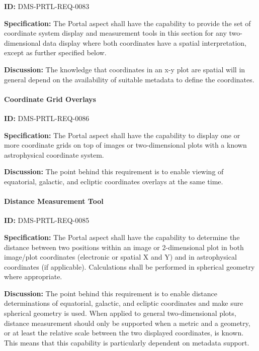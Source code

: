 \documentclass[SE,toc,lsstdraft]{lsstdoc}
\begin{document}
\label{DMS-PRTL-REQ-0083}
\textbf{ID:} DMS-PRTL-REQ-0083

\textbf{Specification:}
The Portal aspect shall have the capability to provide the set of coordinate system display and measurement tools in this section for any two-dimensional data display where both coordinates have a spatial interpretation, except as further specified below.

\textbf{Discussion:}
The knowledge that coordinates in an x-y plot are spatial will in general depend on the availability of suitable metadata to define the coordinates.

\paragraph{Coordinate Grid Overlays}\hfill  %

\label{DMS-PRTL-REQ-0086}
\textbf{ID:} DMS-PRTL-REQ-0086

\textbf{Specification:}
The Portal aspect shall have the capability to display one or more coordinate grids on top of images or two-dimensional plots with a known astrophysical coordinate system.

\textbf{Discussion:}
The point behind this requirement is to enable viewing of equatorial, galactic, and ecliptic coordinates overlays at the same time.

\paragraph{Distance Measurement Tool}\hfill  %

\label{DMS-PRTL-REQ-0085}
\textbf{ID:} DMS-PRTL-REQ-0085

\textbf{Specification:}
The Portal aspect shall have the capability to determine the distance between two positions within an image or 2-dimensional plot in both image/plot coordinates (electronic or spatial X and Y) and in astrophysical coordinates (if applicable).  Calculations shall be performed in spherical geometry where appropriate.

\textbf{Discussion:}
The point behind this requirement is to enable distance determinations of equatorial, galactic, and ecliptic coordinates and make sure spherical geometry is used.
When applied to general two-dimensional plots, distance measurement should only be supported when a metric and a geometry, or at least the relative scale between the two displayed coordinates, is known.
This means that this capability is particularly dependent on metadata support.
\end{document}
